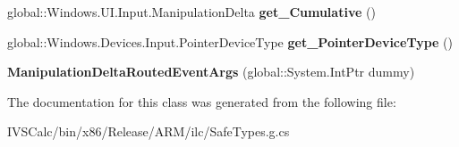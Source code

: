 \begin{DoxyCompactItemize}
global\+::\+Windows.\+U\+I.\+Input.\+Manipulation\+Delta {\bfseries get\+\_\+\+Cumulative} ()
\item 
\mbox{\label{class_windows_1_1_u_i_1_1_xaml_1_1_input_1_1_manipulation_delta_routed_event_args_a6ff18b6b25e1e900fe23b68fa43d2e5b}} 
global\+::\+Windows.\+Devices.\+Input.\+Pointer\+Device\+Type {\bfseries get\+\_\+\+Pointer\+Device\+Type} ()
\item 
\mbox{\label{class_windows_1_1_u_i_1_1_xaml_1_1_input_1_1_manipulation_delta_routed_event_args_ae088e92366daef1247b7638be4049fbe}} 
{\bfseries Manipulation\+Delta\+Routed\+Event\+Args} (global\+::\+System.\+Int\+Ptr dummy)
\end{DoxyCompactItemize}


The documentation for this class was generated from the following file\+:\begin{DoxyCompactItemize}
\item 
I\+V\+S\+Calc/bin/x86/\+Release/\+A\+R\+M/ilc/Safe\+Types.\+g.\+cs\end{DoxyCompactItemize}
